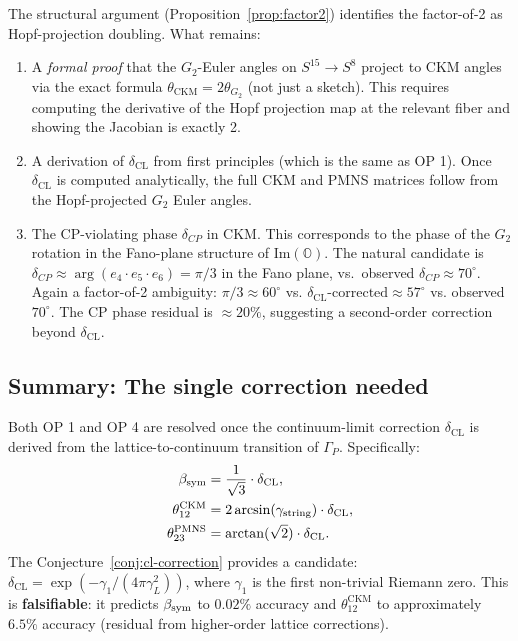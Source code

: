 \begin{remark}
The structural argument (Proposition~\ref{prop:factor2}) identifies
the factor-of-2 as Hopf-projection doubling. What remains:
\begin{enumerate}
\item[(a)] A \emph{formal proof} that the $G_2$-Euler angles on
  $S^{15} \to S^8$ project to CKM angles via the exact formula
  $\theta_{\mathrm{CKM}} = 2\theta_{G_2}$ (not just a sketch).
  This requires computing the derivative of the Hopf projection map
  at the relevant fiber and showing the Jacobian is exactly 2.
\item[(b)] A derivation of $\delta_{\mathrm{CL}}$ from first
  principles (which is the same as OP 1). Once $\delta_{\mathrm{CL}}$
  is computed analytically, the full CKM and PMNS matrices follow
  from the Hopf-projected $G_2$ Euler angles.
\item[(c)] The CP-violating phase $\delta_{CP}$ in CKM. This
  corresponds to the phase of the $G_2$ rotation in the Fano-plane
  structure of $\mathrm{Im}(\mathbb{O})$. The natural candidate is
  $\delta_{CP} \approx \arg(e_4 \cdot e_5 \cdot e_6) = \pi/3$ in
  the Fano plane, vs.\ observed $\delta_{CP} \approx 70^\circ$.
  Again a factor-of-2 ambiguity: $\pi/3 \approx 60^\circ$ vs. $\delta_{\mathrm{CL}}\text{-corrected} \approx 57^\circ$ vs. observed $70^\circ$. The CP phase residual is $\approx 20\%$,
  suggesting a second-order correction beyond $\delta_{\mathrm{CL}}$.
\end{enumerate}
\end{remark}

\subsection{Summary: The single correction needed}

\begin{theorem}\label{thm:op1op4-unified}
Both OP 1 and OP 4 are resolved once the continuum-limit correction
$\delta_{\mathrm{CL}}$ is derived from the lattice-to-continuum
transition of $\Gamma_P$. Specifically:
\begin{align}
  \beta_{\mathrm{sym}} &= \frac{1}{\sqrt{3}} \cdot \delta_{\mathrm{CL}}, \\
  \theta_{12}^{\mathrm{CKM}} &= 2\arcsin(\gamma_{\mathrm{string}})
    \cdot \delta_{\mathrm{CL}}, \\
  \theta_{23}^{\mathrm{PMNS}} &= \arctan(\sqrt{2}) \cdot \delta_{\mathrm{CL}}.
\end{align}
The Conjecture~\ref{conj:cl-correction} provides a candidate:
$\delta_{\mathrm{CL}} = \exp(-\gamma_1/(4\pi\gamma_L^2))$, where
$\gamma_1$ is the first non-trivial Riemann zero. This is
\textbf{falsifiable}: it predicts $\beta_{\mathrm{sym}}$ to $0.02\%$ accuracy
and $\theta_{12}^{\mathrm{CKM}}$ to approximately $6.5\%$ accuracy
(residual from higher-order lattice corrections).
\end{theorem}

